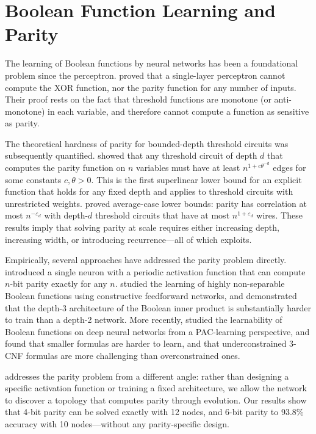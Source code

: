 \section{Boolean Function Learning and Parity}
\label{sec:boolean}

The learning of Boolean functions by neural networks has been a foundational
problem since the perceptron. \citet{minsky1969perceptrons} proved that a
single-layer perceptron cannot compute the XOR function, nor the parity
function for any number of inputs. Their proof rests on the fact that
threshold functions are monotone (or anti-monotone) in each variable, and
therefore cannot compute a function as sensitive as parity.

The theoretical hardness of parity for bounded-depth threshold circuits was
subsequently quantified. \citet{impagliazzo1997size} showed that any
threshold circuit of depth $d$ that computes the parity function on $n$
variables must have at least $n^{1 + c\theta^{-d}}$ edges for some constants
$c, \theta > 0$. This is the first superlinear lower bound for an explicit
function that holds for any fixed depth and applies to threshold circuits with
unrestricted weights. \citet{2018averagecase} proved average-case lower
bounds: parity has correlation at most $n^{-\varepsilon_d}$ with depth-$d$
threshold circuits that have at most $n^{1+\varepsilon_d}$ wires. These results
imply that solving parity at scale requires either increasing depth, increasing
width, or introducing recurrence—all of which \modnet{} exploits.

Empirically, several approaches have addressed the parity problem directly.
\citet{iyoda2003parity} introduced a single neuron with a periodic activation
function that can compute $n$-bit parity exactly for any $n$.
\citet{grochowski2007learning} studied the learning of highly non-separable
Boolean functions using constructive feedforward networks, and demonstrated
that the depth-3 architecture of the Boolean inner product is substantially
harder to train than a depth-2 network. More recently, \citet{2024pac}
studied the learnability of Boolean functions on deep neural networks from a
PAC-learning perspective, and found that smaller formulas are harder to learn,
and that underconstrained 3-CNF formulas are more challenging than
overconstrained ones.

\modnet{} addresses the parity problem from a different angle: rather than
designing a specific activation function or training a fixed architecture, we
allow the network to discover a topology that computes parity through
evolution. Our results show that 4-bit parity can be solved exactly with 12
nodes, and 6-bit parity to 93.8\% accuracy with 10 nodes—without any
parity-specific design.

